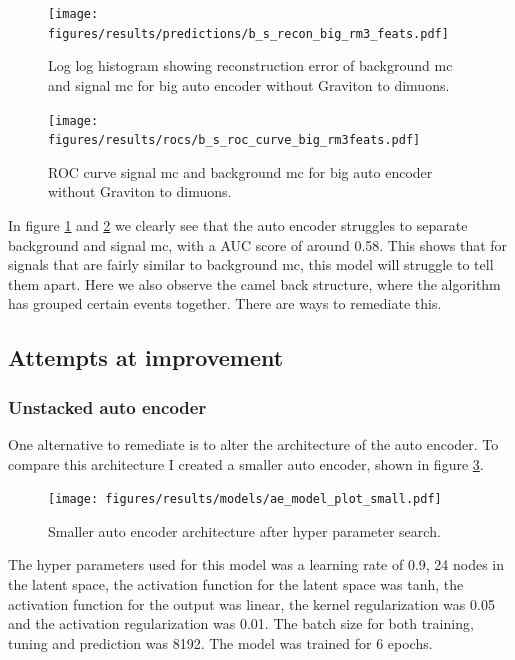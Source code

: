 \documentclass[ reprint, amsmath,amssymb, aps, nofootinbib]{revtex4-2}
\begin{document}
\begin{figure}[H]    
     \centering
    \texttt{[image: figures/results/predictions/b\_s\_recon\_big\_rm3\_feats.pdf]}
    \caption{Log log histogram showing reconstruction error of background mc and signal mc for big auto encoder without Graviton to dimuons.  }
    \label{fig:s_b_big_allsig_nogmumu}
\end{figure}

\begin{figure}[H]    
  \centering
         \texttt{[image: figures/results/rocs/b\_s\_roc\_curve\_big\_rm3feats.pdf]}
         \caption{ROC curve signal mc and background mc for big auto encoder without Graviton to dimuons. }
         \label{fig:roc_sig_big_allsig_nogmumu}
\end{figure}


In figure \ref{fig:s_b_big_allsig_nogmumu} and \ref{fig:roc_sig_big_allsig_nogmumu} we clearly see that the auto encoder struggles to separate background and signal mc, with a AUC score of around 0.58. This shows that for signals that are fairly similar to background mc, this model will struggle to tell them apart. Here we also observe the camel back structure, where the algorithm has grouped certain events together. There are ways to remediate this.

\subsection{Attempts at improvement}

\subsubsection{Unstacked auto encoder}

One alternative to remediate is to alter the architecture of the auto encoder. To compare this architecture I created a smaller auto encoder, shown in figure \ref{fig:small_ae_plot}.

\begin{figure}[H]
    \centering
    \texttt{[image: figures/results/models/ae\_model\_plot\_small.pdf]}
    \caption{Smaller auto encoder architecture after hyper parameter search. }
    \label{fig:small_ae_plot}
\end{figure}

The hyper parameters used for this model was a learning rate of 0.9, 24 nodes in the latent space, the activation function for the latent space was tanh, the activation function for the output was linear, the kernel regularization was 0.05 and the activation regularization was 0.01. The batch size for both training, tuning and prediction was 8192. The model was trained for 6 epochs. 
\end{document}
